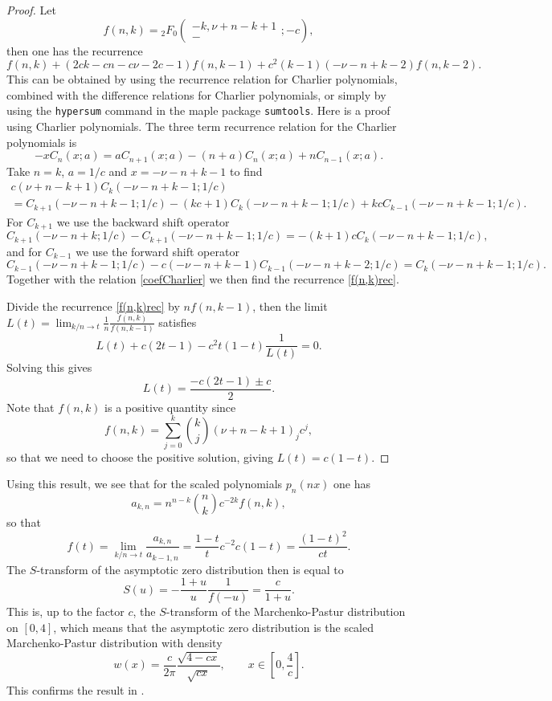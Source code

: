 \documentclass[12pt]{article}
\numberwithin{equation}{section}
\begin{document}
\begin{proof}
Let
\[   f(n,k) =  {}_2F_0\left( \begin{array}{c}   -k, \nu+n-k+1 \\  - \end{array}; -c  \right), \]
then one has the recurrence
\begin{equation}   \label{f(n,k)rec}
    f(n,k) + (2ck-cn-c\nu-2c-1) f(n,k-1) + c^2(k-1)(-\nu-n+k-2) f(n,k-2).  
\end{equation}
This can be obtained by using the recurrence relation for Charlier polynomials, combined with the difference relations for Charlier polynomials,
or simply by using the \texttt{hypersum} command in the maple package \texttt{sumtools}. Here is a proof using Charlier polynomials.
The three term recurrence relation for the Charlier polynomials is \cite[Eq (9.14.3) on p.~247]{koekoek}
\begin{equation}  \label{Charlier3TR}
  -x C_n(x;a) = a C_{n+1}(x;a) - (n+a) C_n(x;a) + n C_{n-1}(x;a).   
\end{equation}
Take $n=k$, $a=1/c$ and $x=-\nu-n+k-1$ to find
\begin{multline*}  c(\nu+n-k+1) C_k(-\nu-n+k-1;1/c) \\
= C_{k+1}(-\nu-n+k-1;1/c) - (kc+1) C_k(-\nu-n+k-1;1/c) + kc C_{k-1}(-\nu-n+k-1;1/c). 
\end{multline*}
For  $C_{k+1}$ we use the backward shift operator \cite[Eq. (9.14.8) on p.~248]{koekoek} 
\[      C_{k+1}(-\nu-n+k;1/c) - C_{k+1}(-\nu-n+k-1;1/c) = -(k+1) c C_k(-\nu-n+k-1;1/c),  \]
and for $C_{k-1}$ we use the forward shift operator \cite[Eq. (9.14.6) on p.~248]{koekoek} 
\[     C_{k-1}(-\nu-n+k-1;1/c) - c(-\nu-n+k-1) C_{k-1}(-\nu-n+k-2;1/c) = C_k(-\nu-n+k-1;1/c).  \]
Together with the relation \eqref{coefCharlier} we then find the recurrence \eqref{f(n,k)rec}.

Divide the recurrence \eqref{f(n,k)rec} by $n f(n,k-1)$, then the limit $L(t) = \lim_{k/n \to t} \frac{1}{n} \frac{f(n,k)}{f(n,k-1)}$ satisfies
\[  L(t) + c(2t-1) - c^2t(1-t) \frac{1}{L(t)} = 0.  \]
Solving this gives
\[   L(t) = \frac{-c(2t-1) \pm c}{2}.  \]
Note that $f(n,k)$ is a positive quantity since
\[     f(n,k) = \sum_{j=0}^k \binom{k}{j} (\nu+n-k+1)_j c^j, \]
so that we need to choose the positive solution, giving $L(t) = c(1-t)$.
\end{proof}

Using this result, we see that for the scaled polynomials $p_n(nx)$ one has
\[  a_{k,n} = n^{n-k} \binom{n}{k} c^{-2k} f(n,k), \]
so that
\[    f(t) = \lim_{k/n \to t} \frac{a_{k,n}}{a_{k-1,n}} = \frac{1-t}{t} c^{-2} c(1-t) = \frac{(1-t)^2}{c t}.  \]
The $S$-transform of the asymptotic zero distribution then is equal to
\[   S(u) = - \frac{1+u}{u} \frac{1}{f(-u)} = \frac{c}{1+u}.  \]
This is, up to the factor $c$, the $S$-transform of the Marchenko-Pastur distribution on $[0,4]$, which means that the
asymptotic zero distribution is the scaled Marchenko-Pastur distribution with density
\[     w(x) = \frac{c}{2\pi} \frac{\sqrt{4-cx}}{\sqrt{cx}}, \qquad x \in [0,\frac{4}{c}].  \]
This confirms the result in \cite[Corollary 1]{Coussement-WVA2}. 
\end{document}
